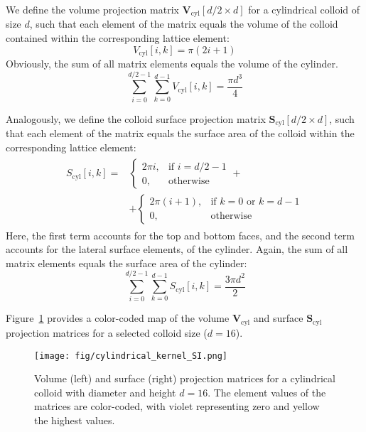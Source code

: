 \documentclass[10pt, a4paper, twocolumn]{article}
\begin{document}
We define the volume projection matrix $\bm{V}_{\text{cyl}}[d/2 \times d]$ for a cylindrical colloid of size $d$, such that each element of the matrix equals the volume of the colloid contained within the corresponding lattice element:
\begin{equation}
    V_{\text{cyl}}[i, k] = \pi(2i + 1)
\end{equation}
Obviously, the sum of all matrix elements equals the volume of the cylinder.
\begin{equation*}
    \sum_{i=0}^{d/2 - 1} \sum_{k=0}^{d - 1} V_{\text{cyl}}[i, k] = \frac{\pi d^3}{4}
\end{equation*}

Analogously, we define the colloid surface projection matrix $\bm{S}_{\text{cyl}}[d/2 \times d]$, such that each element of the matrix equals the surface area of the colloid within the corresponding lattice element:
\begin{align}
    \begin{split}
        S_{\text{cyl}}[i, k] = 
        &\begin{cases}
            2 \pi i,   & \text{if } i = d/2 - 1 \\
            0,         & \text{otherwise}
        \end{cases} +
        \\
        &+
        \begin{cases}
            2 \pi (i + 1), & \text{if } k = 0 \text{ or } k = d - 1 \\
            0,             & \text{otherwise}
        \end{cases}
    \end{split}
\end{align}
Here, the first term accounts for the top and bottom faces, and the second term accounts for the lateral surface elements, of the cylinder.
Again, the sum of all matrix elements equals the surface area of the cylinder:
\begin{equation*}
    \sum_{i=0}^{d/2 - 1} \sum_{k=0}^{d - 1} S_{\text{cyl}}[i, k] = \frac{3 \pi d^2}{2}
\end{equation*}

Figure~\ref{fig:cylindrical_kernel_SI} provides a color-coded map of the volume $\bm{V}_{\text{cyl}}$ and surface $\bm{S}_{\text{cyl}}$ projection matrices for a selected colloid size ($d = 16$).

\begin{figure}[h]
    \centering
    \texttt{[image: fig/cylindrical\_kernel\_SI.png]}
    \caption{
    Volume (left) and surface (right) projection matrices for a cylindrical colloid with diameter and height $d = 16$. The element values of the matrices are color-coded, with violet representing zero and yellow the highest values.
    }
    \label{fig:cylindrical_kernel_SI}
\end{figure}
\end{document}
